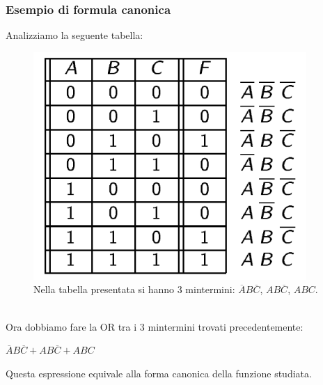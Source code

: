 \documentclass[12pt]{article}
\begin{document}
\subsubsection{Esempio di formula canonica}
Analizziamo la seguente tabella:
\begin{figure}[!htb]
    \centering
    \includegraphics[width=.7\textwidth, height=.7\textheight,keepaspectratio]{porte_logiche/canonica.png} %
    \begin{center}
        \caption{\label{fig:canonica_esempio}Nella tabella presentata si hanno 3 mintermini: $\overline{A}B\overline{C}$, $AB\overline{C}$, $ABC$.} %
    \end{center}
\end{figure}\\
Ora dobbiamo fare la OR tra i 3 mintermini trovati precedentemente:
\begin{center}
    $\overline{A}B\overline{C} + AB\overline{C} + ABC$
\end{center}
Questa espressione equivale alla forma canonica della funzione studiata.
\pagebreak
\end{document}

